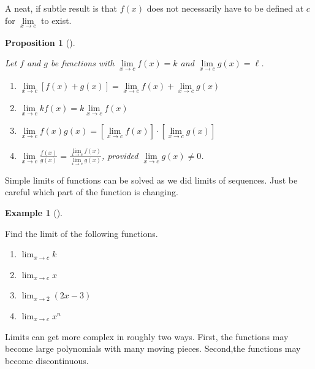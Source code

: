 \documentclass[
  letterpaper,
]{book}
\providecommand{\tightlist}{%
  \setlength{\itemsep}{0pt}\setlength{\parskip}{0pt}}\usepackage{longtable,booktabs,array}
\theoremstyle{definition}
\theoremstyle{definition}
\newtheorem{example}{Example}[chapter]
\theoremstyle{plain}
\newtheorem{proposition}{Proposition}[chapter]
\theoremstyle{definition}
\theoremstyle{plain}
\theoremstyle{plain}
\theoremstyle{remark}
\begin{document}
A neat, if subtle result is that \(f(x)\) does not necessarily have to
be defined at \(c\) for \(\lim\limits_{x \to c}\) to exist.

\leavevmode{}%
\begin{proposition}[]\label{prp-limfun}

Let \(f\) and \(g\) be functions with \(\lim\limits_{x \to c} f(x)=k\)
and \(\lim\limits_{x \to c} g(x)=\ell\).

\begin{enumerate}
\def\labelenumi{\arabic{enumi}.}
\tightlist
\item
  \(\lim\limits_{x \to c}[f(x)+g(x)]=\lim\limits_{x \to c} f(x)+ \lim\limits_{x \to c} g(x)\)
\item
  \(\lim\limits_{x \to c} kf(x) = k\lim\limits_{x \to c} f(x)\)
\item
  \(\lim\limits_{x \to c} f(x) g(x) = \left[\lim\limits_{x \to c} f(x)\right]\cdot \left[\lim\limits_{x \to c} g(x)\right]\)
\item
  \(\lim\limits_{x \to c} \frac{f(x)}{g(x)} = \frac{\lim\limits_{x \to c} f(x)}{\lim\limits_{x \to c} g(x)}\),
  provided \(\lim\limits_{x \to c} g(x)\ne 0\).
\end{enumerate}

\end{proposition}

Simple limits of functions can be solved as we did limits of sequences.
Just be careful which part of the function is changing.

\leavevmode{}%
\begin{example}[]\label{exm-limfun1}

Find the limit of the following functions.

\begin{enumerate}
\def\labelenumi{\arabic{enumi}.}
\tightlist
\item
  \(\lim_{x \to c} k\)
\item
  \(\lim_{x \to c} x\)
\item
  \(\lim_{x\to 2} (2x-3)\)
\item
  \(\lim_{x \to c} x^n\)
\end{enumerate}

\end{example}

Limits can get more complex in roughly two ways. First, the functions
may become large polynomials with many moving pieces. Second,the
functions may become discontinuous.
\end{document}
